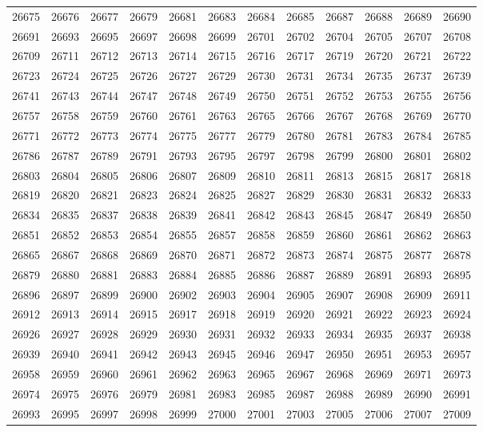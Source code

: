 \begin{center}
\begin{longtable}{llllllllllll}
26675 &26676 &26677 &26679 &26681 &26683 &26684 &26685 &26687 &26688 &26689 &26690 \\
26691 &26693 &26695 &26697 &26698 &26699 &26701 &26702 &26704 &26705 &26707 &26708 \\
26709 &26711 &26712 &26713 &26714 &26715 &26716 &26717 &26719 &26720 &26721 &26722 \\
26723 &26724 &26725 &26726 &26727 &26729 &26730 &26731 &26734 &26735 &26737 &26739 \\
26741 &26743 &26744 &26747 &26748 &26749 &26750 &26751 &26752 &26753 &26755 &26756 \\
26757 &26758 &26759 &26760 &26761 &26763 &26765 &26766 &26767 &26768 &26769 &26770 \\
26771 &26772 &26773 &26774 &26775 &26777 &26779 &26780 &26781 &26783 &26784 &26785 \\
26786 &26787 &26789 &26791 &26793 &26795 &26797 &26798 &26799 &26800 &26801 &26802 \\
26803 &26804 &26805 &26806 &26807 &26809 &26810 &26811 &26813 &26815 &26817 &26818 \\
26819 &26820 &26821 &26823 &26824 &26825 &26827 &26829 &26830 &26831 &26832 &26833 \\
26834 &26835 &26837 &26838 &26839 &26841 &26842 &26843 &26845 &26847 &26849 &26850 \\
26851 &26852 &26853 &26854 &26855 &26857 &26858 &26859 &26860 &26861 &26862 &26863 \\
26865 &26867 &26868 &26869 &26870 &26871 &26872 &26873 &26874 &26875 &26877 &26878 \\
26879 &26880 &26881 &26883 &26884 &26885 &26886 &26887 &26889 &26891 &26893 &26895 \\
26896 &26897 &26899 &26900 &26902 &26903 &26904 &26905 &26907 &26908 &26909 &26911 \\
26912 &26913 &26914 &26915 &26917 &26918 &26919 &26920 &26921 &26922 &26923 &26924 \\
26926 &26927 &26928 &26929 &26930 &26931 &26932 &26933 &26934 &26935 &26937 &26938 \\
26939 &26940 &26941 &26942 &26943 &26945 &26946 &26947 &26950 &26951 &26953 &26957 \\
26958 &26959 &26960 &26961 &26962 &26963 &26965 &26967 &26968 &26969 &26971 &26973 \\
26974 &26975 &26976 &26979 &26981 &26983 &26985 &26987 &26988 &26989 &26990 &26991 \\
26993 &26995 &26997 &26998 &26999 &27000 &27001 &27003 &27005 &27006 &27007 &27009 \\

\end{longtable}
\end{center}
